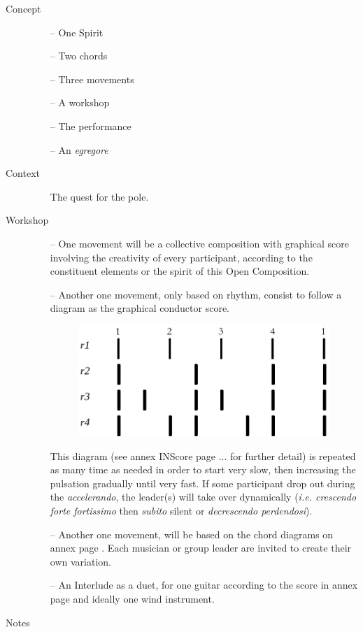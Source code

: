 \begin{description}
\item[Concept] \hfill 
\begin{itemize}
\item[--] One Spirit
\item[--] Two chords
\item[--] Three movements
\item[--] A workshop
\item[--] The performance
\item[--] An \textit{egregore}
\end{itemize}
\bigskip
\item[Context] \hfill 
\begin{itemize}
\item[] The quest for the pole.
\end{itemize}
\bigskip
\item[Workshop] \hfill 
\begin{itemize}
\item[--] One movement will be a collective composition with graphical score involving the creativity of every participant, according to the constituent elements or the spirit of this Open Composition.  
\item[--] Another one movement, only based on rhythm, consist to follow a diagram as the graphical conductor score. 
 \begin{figure}[H]
\begin{center}
\includegraphics[scale=0.3]{img/nrtm}
\end{center}
\end{figure}
This diagram (see annex INScore page ... for further detail) is repeated as many time as needed in order to start very slow, then increasing the pulsation gradually until very fast. If some participant drop out during the \textit{accelerando}, the leader(s) will take over dynamically (\textit{i.e. crescendo forte fortissimo} then \textit{subito} silent or \textit{decrescendo perdendosi}).
\item[--] Another one movement, will be based on the chord diagrams on annex page \pageref{oco2}. Each musician or group leader are invited to create their own variation.
\item[--] An Interlude as a duet, for one guitar according to the score in annex page \pageref{interlude} and ideally one wind instrument.
\end{itemize}
\bigskip
\item[Notes] \hfill 


\end{description}
